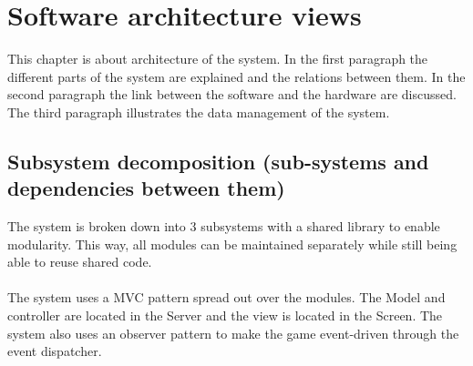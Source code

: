 \documentclass[11pt,a4paper]{article}
\begin{document}
\newpage

\section{Software architecture views}
This chapter is about architecture of the system. In the first paragraph the different parts of the system are explained and the relations between them. In the second paragraph the link between the software and the hardware are discussed. The third paragraph illustrates the data management of the system.

\subsection{Subsystem decomposition (sub-systems and dependencies between them)}
The system is broken down into 3 subsystems with a shared library to enable modularity. This way, all modules can be maintained separately while still being able to reuse shared code.\\
\\
The system uses a MVC pattern spread out over the modules. The Model and controller are located in the Server and the view is located in the Screen. The system also uses an observer pattern to make the game event-driven through the event dispatcher. 
\end{document}
